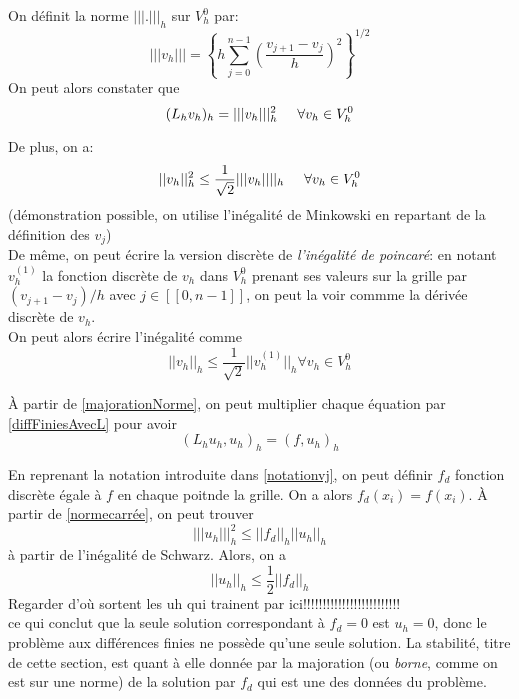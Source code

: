\documentclass[12pt]{article}
\newcommand{\espace}{\hspace{5mm}}
\begin{document}
On définit la norme $|||.|||_h$ sur $V_h^0$ par:
\begin{equation}
	|||v_h||| = \left\{ h \sum_{j = 0}^{n-1} ( \frac{v_{j+1} - v_j}{h})^2 \right\} ^{1/2}
 \end{equation}
On peut alors constater que
\begin{equation} \label{normecarrée}
	(L_h v_h)_h = |||v_h|||^2_h \espace \forall v_h \in V^0_h
\end{equation}

De plus, on a:
\begin{equation} \label{majorationNorme}
	||v_h||_h^2 \le \frac{1}{\sqrt{2}} |||v_h||||_h \espace \forall v_h \in V_h^0
\end{equation}
(démonstration possible, on utilise l'inégalité de Minkowski en repartant de la définition des $v_j$)\\
De même, on peut écrire la version discrète de \emph{l'inégalité de poincaré}: en notant $v_h^{(1)}$ la fonction discrète de $v_h$ dans $V_h^0$ prenant ses valeurs sur la grille par $(v_{j+1}-v_j)/h$ avec $j \in [[0, n-1]]$, on peut la voir commme la dérivée discrète de $v_h$.\\
On peut alors écrire l'inégalité comme
\begin{equation}
	||v_h||_h \le \frac{1}{\sqrt{2}} ||v_h^{(1)}||_h \forall v_h \in V_h^0
\end{equation}

À partir de \eqref{majorationNorme}, on peut multiplier chaque équation par \eqref{diffFiniesAvecL} pour avoir
\begin{equation}
	(L_h u_h , u_h )_h = (f, u_h)_h
\end{equation}

En reprenant la notation introduite dans \eqref{notationvj}, on peut définir $f_d$ fonction discrète égale à $f$ en chaque poitnde la grille. On a alors $f_d(x_i) = f(x_i)$.  À partir de \eqref{normecarrée}, on peut trouver
\begin{equation}
|||u_h|||_h^2 \le ||f_d||_h ||u_h||_h
\end{equation}
à partir de l'inégalité de Schwarz.
Alors,  on a 
\begin{equation} \label{preuveStabilité}
||u_h||_h \le \frac{1}{2}||f_d||_h
\end{equation}
Regarder d'où sortent les uh qui trainent par ici!!!!!!!!!!!!!!!!!!!!!!!!! \\
ce qui conclut que la seule solution correspondant à $f_d = 0$ est $u_h = 0$, donc le problème aux différences finies ne possède qu'une seule solution. La stabilité, titre de cette section, est quant à elle donnée par la majoration (ou \emph{borne}, comme on est sur une norme) de la solution par $f_d$ qui est une des données du problème.
\end{document}
